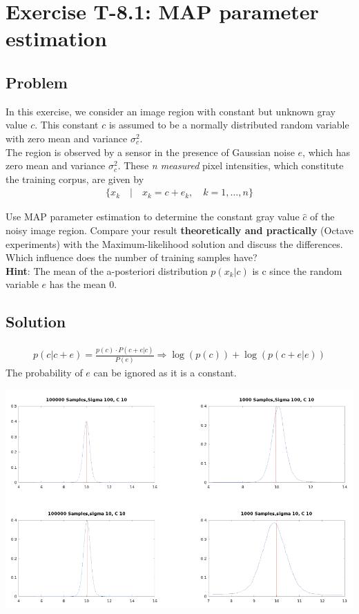\section*{Exercise T-8.1: MAP parameter estimation}

\subsection*{Problem}
In this exercise, we consider an image region with constant but unknown gray value $c$.
This constant $c$ is assumed to be a normally distributed random variable with zero mean and variance $\sigma_c^2$.\\

The region is observed by a sensor in the presence of Gaussian noise $e$, which has zero mean and variance $\sigma_c^2$.
These\textit{ n measured} pixel intensities, which constitute the training corpus, are given by
\begin{align*}
	\{x_k\quad |\quad x_k = c + e_k,\quad k = 1,...,n\}
\end{align*}

Use MAP parameter estimation to determine the constant gray value $\hat{c}$ of the noisy image region.
Compare your result \textbf{theoretically and practically} (Octave experiments) with the Maximum-likelihood solution and discuss the differences.
Which influence does the number of training samples have?\\

\textbf{Hint}: The mean of the a-posteriori distribution $p(x_k|c)$ is c since the random variable $e$ has the mean 0.

\subsection*{Solution}
\begin{align*}
 p(c|c+e) = \frac{p(c)\cdot P(c+e|c)}{P(e)}\Rightarrow\log(p(c))+\log(p(c+e|e))
\end{align*}
The probability of $e$ can be ignored as it is a constant.

\includegraphics[width=1\linewidth]{curves}